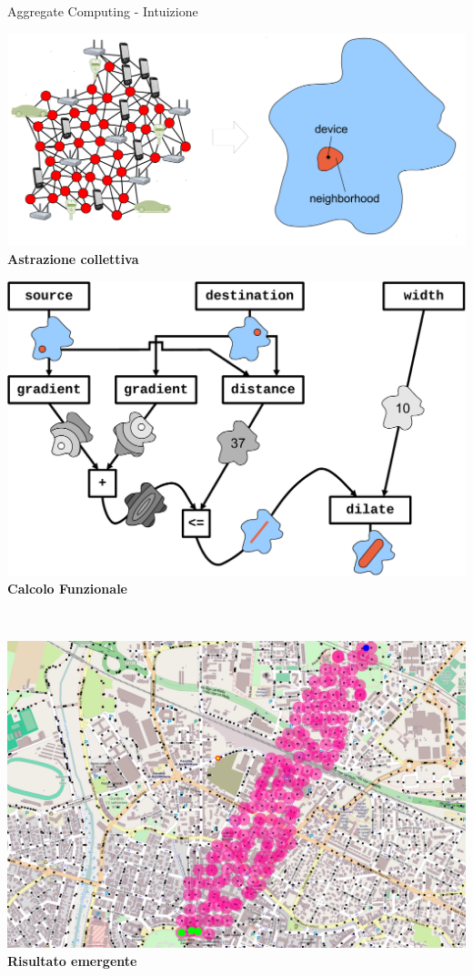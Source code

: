 \documentclass[presentation, 10pt,aspectratio=169]{beamer}\mode<presentation>{\usetheme{AMSBolognaFC}}
\begin{document}
\begin{frame}{Aggregate Computing - Intuizione}
	\begin{center}
		\begin{minipage}{0.3\textwidth}
			\includegraphics[width=\textwidth]{img/ac.png}
			\\[0.75cm]
			\centering \textbf{Astrazione collettiva}
		\end{minipage}
		\begin{minipage}{0.3\textwidth}
			\includegraphics[width=\textwidth]{img/channel.pdf}
			\centering \textbf{Calcolo Funzionale} 
		\end{minipage}
		\\[0.3cm]
		\begin{minipage}{0.3\textwidth}
			\includegraphics[width=\textwidth]{img/cesena0}
			\centering \alert{\textbf{Risultato emergente}}
		\end{minipage}
	\end{center}
\end{frame}
\end{document}
